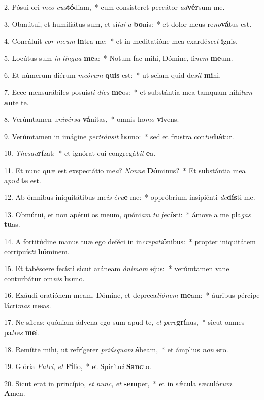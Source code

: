 2. Pósui ori \textit{me}\textit{o} \textit{cus}\textbf{tó}diam,~*  cum consísteret peccátor \textit{ad}\textbf{vér}sum me.\

3. Obmútui, et humiliátus sum, et sí\textit{lu}\textit{i} \textit{a} \textbf{bo}nis:~*  et dolor meus re\textit{no}\textbf{vá}tus est.\

4. Concáluit \textit{cor} \textit{me}\textit{um} \textbf{in}tra me:~*  et in meditatióne mea exardé\textit{scet} \textbf{i}gnis.\

5. Locútus sum \textit{in} \textit{lin}\textit{gua} \textbf{me}a:~*  Notum fac mihi, Dómine, fi\textit{nem} \textbf{me}um.\

6. Et númerum diérum \textit{me}\textit{ó}\textit{rum} \textbf{quis} est:~*  ut sciam quid de\textit{sit} \textbf{mi}hi.\

7. Ecce mensurábiles posuís\textit{ti} \textit{di}\textit{es} \textbf{me}os:~*  et substántia mea tamquam níhi\textit{lum} \textbf{an}te te.\

8. Verúmtamen u\textit{ni}\textit{vér}\textit{sa} \textbf{vá}nitas,~*  omnis ho\textit{mo} \textbf{vi}vens.\

9. Verúmtamen in imágine \textit{per}\textit{tráns}\textit{it} \textbf{ho}mo:~*  sed et frustra con\textit{tur}\textbf{bá}tur.\

10. \textit{The}\textit{sau}\textbf{rí}zat:~*  et ignórat cui congregá\textit{bit} \textbf{e}a.\

11. Et nunc quæ est exspectátio me\textit{a}? \textit{Non}\textit{ne} \textbf{Dó}minus?~*  Et substántia mea a\textit{pud} \textbf{te} est.\

12. Ab ómnibus iniquitátibus me\textit{is} \textit{é}\textit{ru}\textbf{e} me:~*  oppróbrium insipiénti \textit{de}\textbf{dís}ti me.\

13. Obmútui, et non apérui os meum, quóni\textit{am} \textit{tu} \textit{fe}\textbf{cís}ti:~*  ámove a me pla\textit{gas} \textbf{tu}as.\

14. A fortitúdine manus tuæ ego deféci in in\textit{cre}\textit{pa}\textit{ti}\textbf{ó}nibus:~*  propter iniquitátem corripuís\textit{ti} \textbf{hó}minem.\

15. Et tabéscere fecísti sicut aráneam \textit{á}\textit{ni}\textit{mam} \textbf{e}jus:~*  verúmtamen vane conturbátur om\textit{nis} \textbf{ho}mo.\

16. Exáudi oratiónem meam, Dómine, et depreca\textit{ti}\textit{ó}\textit{nem} \textbf{me}am:~*  áuribus pércipe lácri\textit{mas} \textbf{me}as.\

17. Ne síleas: quóniam ádvena ego sum apud te, \textit{et} \textit{per}\textit{e}\textbf{grí}nus,~*  sicut omnes pa\textit{tres} \textbf{me}i.\

18. Remítte mihi, ut refrígerer \textit{pri}\textit{ús}\textit{quam} \textbf{á}beam,~*  et ámplius \textit{non} \textbf{e}ro.\

19. Glória \textit{Pa}\textit{tri}, \textit{et} \textbf{Fí}lio,~*  et Spirítu\textit{i} \textbf{Sanc}to.\

20. Sicut erat in princípio, \textit{et} \textit{nunc}, \textit{et} \textbf{sem}per,~*  et in sǽcula sæculó\textit{rum}. \textbf{A}men.\

